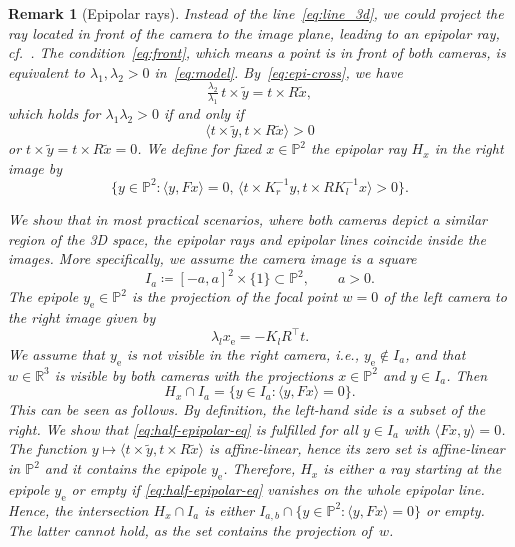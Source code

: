 \documentclass[10pt, twocolumn]{article}
\newtheorem{remark}[theorem]{Remark}
\theoremstyle{definition}
\newcommand{\R}{{\ensuremath{\mathbb{R}}}}
\newcommand{\e}{\mathrm{e}}
\begin{document}
\begin{remark}[Epipolar rays]

Instead of the line~\eqref{eq:line_3d}, we could project the ray located in front of the camera to the image plane,
leading to an {epipolar ray}, cf.\ \cite{Darmon2021,Haming2007,Pollefeys1999}.
The condition~\eqref{eq:front}, which means a point is in front of both cameras, is equivalent to $\lambda_1,\lambda_2>0$ in~\eqref{eq:model}.
By~\eqref{eq:epi-cross}, we have
$$
\tfrac{\lambda_2}{\lambda_1}\, t \times \tilde{y} = t \times R \tilde{x},
$$
which holds for $\lambda_1\lambda_2>0$ if and only if
\begin{equation} \label{eq:half-epipolar-eq}
\langle t \times \tilde{y}, t \times R \tilde{x} \rangle > 0
\end{equation}
or $t\times\tilde y = t\times R\tilde x=0$.
We define for fixed $x\in\mathbb P^2$ the {epipolar ray} $H_x$ in the right image by
\begin{equation} \label{eq:half-epipolar}
\{y\in\mathbb P^2 : \langle y,Fx\rangle=0,\, \langle t\times K_r^{-1}y,t\times RK_l^{-1}x\rangle >0\}.
\end{equation}

We show that in most practical scenarios, where both cameras depict a similar region of the 3D space,
the epipolar rays and epipolar lines coincide inside the images.
More specifically, we assume the camera image is a square
$$
I_{a} \coloneqq 
[-a,a]^2 \times \{1\} \subset \mathbb P^2
,\qquad a>0.
$$
The {epipole} $y_\e\in\mathbb P^2$ is the projection of the focal point $w=0$ of the left camera to the right image
given by
\begin{equation} \label{eq:epipole}
\lambda_l x_\e = -K_l R^\top t.
\end{equation}
We assume that $y_\e$ is not visible in the right camera, i.e., $y_\e\notin I_{a}$,
and that $w\in\R^3$ is visible by both cameras with the projections $x\in \mathbb P^2$ and $y\in I_{a}$.
Then 
\begin{equation} \label{eq:half-line-intersection}
H_x\cap I_{a}
=
\{y\in I_{a} : \langle y,Fx\rangle =0\}.
\end{equation}
This can be seen as follows.
By definition, the left-hand side is a subset of the right. 
We show that \eqref{eq:half-epipolar-eq} is fulfilled for all $y\in I_{a}$ with $\langle Fx,y\rangle=0$.
The function $y\mapsto \langle t\times\tilde y,t\times R\tilde x\rangle$ is affine-linear, 
hence its zero set is affine-linear in $\mathbb P^2$
and it contains the epipole $y_\e$.
Therefore, $H_x$ is either a ray starting at the epipole $y_\e$ or empty if \eqref{eq:half-epipolar-eq} vanishes on the whole epipolar line. 
Hence, the intersection $H_x\cap I_{a}$ is either $I_{a,b}\cap \{y\in\mathbb P^2: \langle y,Fx\rangle=0\}$ or empty.
The latter cannot hold, as the set contains the projection of~$w$.
\end{remark}
\end{document}
